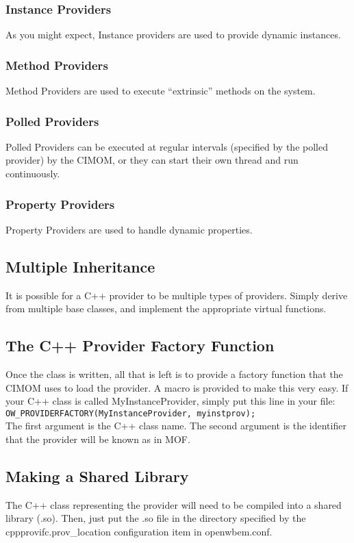 \documentclass[letterpaper,10pt]{article}
\begin{document}
\subsubsection{Instance Providers}
As you might expect, Instance providers are used to provide dynamic 
instances.  
\subsubsection{Method Providers}
Method Providers are used to execute ``extrinsic'' methods on the system.
\subsubsection{Polled Providers}
Polled Providers can be executed at regular intervals (specified by 
the polled provider) by the CIMOM, or they can start their own thread 
and run continuously. 
\subsubsection{Property Providers}
Property Providers are used to handle dynamic properties. 
\subsection{Multiple Inheritance}
It is possible for a C++ provider to be multiple types of providers.  
Simply derive from multiple base classes, and implement the appropriate
virtual functions.  
\subsection{The C++ Provider Factory Function}
Once the class is written, all that is left is to provide a factory 
function that the CIMOM uses to load the provider.  A macro is provided
to make this very easy.  If your C++ class is called 
\mbox{MyInstanceProvider}, simply put this line in your file:\\
\mbox{\texttt{OW\_PROVIDERFACTORY(MyInstanceProvider, myinstprov);}}\\
The first argument is the C++ class name.  The second argument is 
the identifier that the provider will be known as in MOF. 
\subsection{Making a Shared Library}
The C++ class representing the provider will need to be compiled into 
a shared library (.so).  Then, just put the .so file in the directory
specified by the \mbox{cppprovifc.prov\_location} configuration item
in openwbem.conf.
\end{document}

